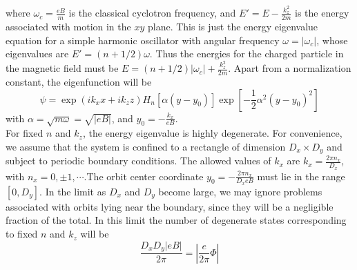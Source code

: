 where $\omega_c = \frac{eB}{m}$ is the classical cyclotron frequency, and $E'=E-\frac{k_z^2}{2m}$ is the energy associated with motion in the $xy$ plane. This is just the energy eigenvalue equation for a simple harmonic oscillator with angular frequency $\omega = |\omega_c|$, whose eigenvalues are $E' = (n+1/2)\omega$. Thus the energies for the charged particle in the magnetic field must be $E = (n+1/2)|\omega_c|+\frac{k_z^2}{2m}$. Apart from a normalization constant, the eigenfunction will be
\[\psi = \exp(ik_xx+ik_zz) H_n[\alpha(y-y_0)]\exp[-\frac{1}{2}\alpha^2 (y-y_0)^2]\]
with $\alpha = \sqrt{m\omega} = \sqrt{|eB|}$, and $y_0 = - \frac{k_x}{eB}$.\\
For fixed $n$ and $k_z$, the energy eigenvalue is highly degenerate. For convenience, we assume that the system is confined to a rectangle of dimension $D_x\times D_y$ and subject to periodic boundary conditions. The allowed
values of $k_x$ are $k_x = \frac{2\pi n_x}{D_x}$, with $n_x = 0,\pm1,\cdots$.The orbit center coordinate $y_0 = -\frac{2\pi n_x}{D_xeB}$ must lie in the range $[0,D_y]$. In the limit as $D_x$ and $D_y$ become large, we may ignore problems associated with orbits lying near the boundary, since they will be a negligible fraction of the total. In this limit the number of degenerate states corresponding to fixed $n$ and $k_z$ will be
\[\frac{D_xD_y |eB|}{2\pi} = \left| \frac{e}{2\pi} \Phi \right|\]

